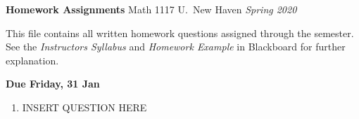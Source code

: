 \documentclass[11pt]{amsart}
\theoremstyle{definition}
\begin{document}

\begin{flushright}
  \textbf{Homework Assignments} \linebreak %
  {Math 1117} \linebreak %
  {U.~New Haven} \linebreak %
  \textit{Spring 2020} %
\end{flushright}

This file contains all written homework questions assigned
through the semester. See the \emph{Instructors Syllabus}
and \emph{Homework Example} in Blackboard for further
explanation. \vspace{2em}


\textbf{Due Friday, 31 Jan} 
\begin{enumerate}
  \item INSERT QUESTION HERE
  \end{enumerate}


\end{document}

